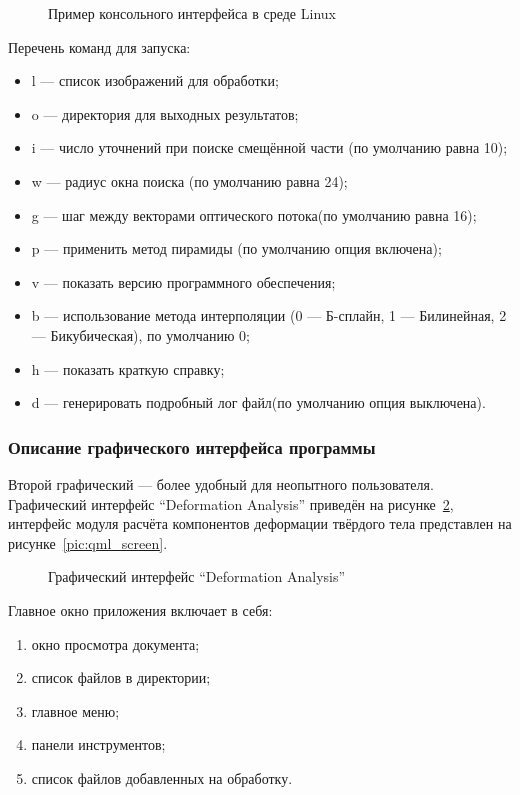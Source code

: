\begin{figure}[h!]
\caption{Пример консольного интерфейса в среде Linux}
\label{pic:con_scr}
\end{figure}

Перечень команд для запуска:
\begin{itemize}
\item l — список изображений для обработки;
\item o — директория для выходных результатов;
\item i — число уточнений при поиске смещённой части (по умолчанию равна 10);
\item w — радиус окна поиска (по умолчанию равна 24);
\item g — шаг между векторами оптического потока(по умолчанию равна 16);
\item p — применить метод пирамиды (по умолчанию опция включена);
\item v — показать версию программного обеспечения;
\item b — использование метода интерполяции (0 — Б-сплайн, 1 — Билинейная, 2 — Бикубическая), по умолчанию 0;
\item h — показать краткую справку;
\item d — генерировать подробный лог файл(по умолчанию опция выключена).
\end{itemize}
\subsubsection{Описание графического интерфейса программы}
Второй графический — более удобный для неопытного пользователя. Графический интерфейс ``Deformation Analysis'' приведён на рисунке~\ref{pic:gui_scr}, интерфейс модуля расчёта компонентов деформации твёрдого тела представлен на рисунке~\ref{pic:qml_screen}. 
\begin{figure}[h!]
\caption{Графический интерфейс ``Deformation Analysis''}
\label{pic:gui_scr}
\end{figure}
Главное окно приложения включает в себя:
\begin{enumerate}
\item окно просмотра документа;
\item список файлов в директории;
\item главное меню;
\item панели инструментов;
\item список файлов добавленных на обработку.
\end{enumerate}

